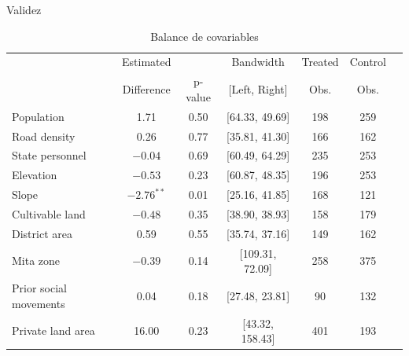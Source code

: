 \documentclass[aspectratio=169,t]{beamer}
\begin{document}
\begin{frame}{Validez}
  
\begin{table}[h]
    \centering
    \caption{Balance de covariables}
    \label{tab:placeholder_label}
    \begin{tabular}{lcccccc}
        \toprule
        & \multicolumn{1}{c}{Estimated} & & \multicolumn{1}{c}{Bandwidth} & \multicolumn{1}{c}{Treated} & \multicolumn{1}{c}{Control} \\
        & \multicolumn{1}{c}{Difference} & \multicolumn{1}{c}{p-value} & \multicolumn{1}{c}{[Left, Right]} & \multicolumn{1}{c}{Obs.} & \multicolumn{1}{c}{Obs.} \\
        \midrule
        Population            &  1.71  & 0.50 & [64.33, 49.69]  & 198 & 259 \\
        Road density          &  0.26  & 0.77 & [35.81, 41.30]  & 166 & 162 \\
        State personnel       & $-0.04$ & 0.69 & [60.49, 64.29]  & 235 & 253 \\
        Elevation             & $-0.53$ & 0.23 & [60.87, 48.35]  & 196 & 253 \\
        Slope                 & $-2.76^{**}$ & 0.01 & [25.16, 41.85]  & 168 & 121 \\
        Cultivable land       & $-0.48$ & 0.35 & [38.90, 38.93]  & 158 & 179 \\
        District area         &  0.59  & 0.55 & [35.74, 37.16]  & 149 & 162 \\
        Mita zone             & $-0.39$ & 0.14 & [109.31, 72.09] & 258 & 375 \\
        Prior social movements&  0.04  & 0.18 & [27.48, 23.81]  &  90 & 132 \\
        Private land area     & 16.00  & 0.23 & [43.32, 158.43] & 401 & 193 \\
        \bottomrule
    \end{tabular}
\end{table}
\end{frame}
\end{document}
